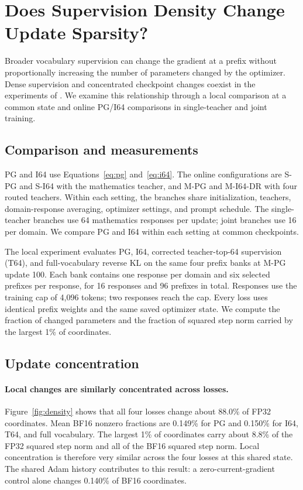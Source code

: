 \section{Does Supervision Density Change Update Sparsity?}
\label{sec:density}

Broader vocabulary supervision can change the gradient at a prefix without proportionally increasing the number of parameters changed by the optimizer. Dense supervision and concentrated checkpoint changes coexist in the experiments of \citet{yu2026denseupdates}. We examine this relationship through a local comparison at a common state and online PG/I64 comparisons in single-teacher and joint training.

\subsection{Comparison and measurements}

PG and I64 use Equations~\ref{eq:pg} and~\ref{eq:i64}. The online configurations are S-PG and S-I64 with the mathematics teacher, and M-PG and M-I64-DR with four routed teachers. Within each setting, the branches share initialization, teachers, domain-response averaging, optimizer settings, and prompt schedule. The single-teacher branches use 64 mathematics responses per update; joint branches use 16 per domain. We compare PG and I64 within each setting at common checkpoints.

The local experiment evaluates PG, I64, corrected teacher-top-64 supervision (T64), and full-vocabulary reverse KL on the same four prefix banks at M-PG update 100. Each bank contains one response per domain and six selected prefixes per response, for 16 responses and 96 prefixes in total. Responses use the training cap of 4,096 tokens; two responses reach the cap. Every loss uses identical prefix weights and the same saved optimizer state. We compute the fraction of changed parameters and the fraction of squared step norm carried by the largest 1\% of coordinates.

\subsection{Update concentration}

\paragraph{Local changes are similarly concentrated across losses.}
Figure~\ref{fig:density} shows that all four losses change about 88.0\% of FP32 coordinates. Mean BF16 nonzero fractions are 0.149\% for PG and 0.150\% for I64, T64, and full vocabulary. The largest 1\% of coordinates carry about 8.8\% of the FP32 squared step norm and all of the BF16 squared step norm. Local concentration is therefore very similar across the four losses at this shared state. The shared Adam history contributes to this result: a zero-current-gradient control alone changes 0.140\% of BF16 coordinates.

